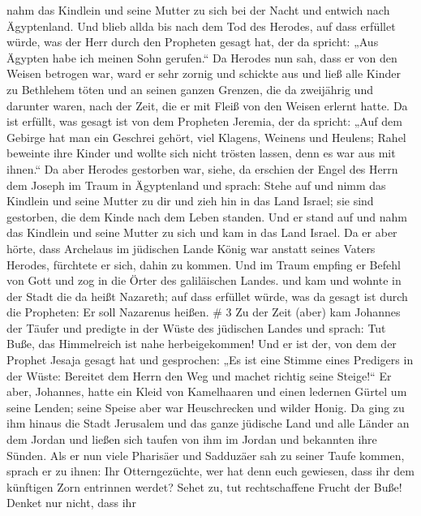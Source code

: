 nahm das Kindlein und seine Mutter zu sich bei der Nacht und entwich
nach Ägyptenland.  Und blieb allda bis nach dem Tod des
Herodes, auf dass erfüllet würde, was der Herr durch den Propheten
gesagt hat, der da spricht: „Aus Ägypten habe ich meinen Sohn gerufen.``
 Da Herodes nun sah, dass er von den Weisen betrogen war,
ward er sehr zornig und schickte aus und ließ alle Kinder zu Bethlehem
töten und an seinen ganzen Grenzen, die da zweijährig und darunter
waren, nach der Zeit, die er mit Fleiß von den Weisen erlernt hatte.
 Da ist erfüllt, was gesagt ist von dem Propheten Jeremia,
der da spricht:  „Auf dem Gebirge hat man ein Geschrei
gehört, viel Klagens, Weinens und Heulens; Rahel beweinte ihre Kinder
und wollte sich nicht trösten lassen, denn es war aus mit ihnen.``
 Da aber Herodes gestorben war, siehe, da erschien der
Engel des Herrn dem Joseph im Traum in Ägyptenland  und
sprach: Stehe auf und nimm das Kindlein und seine Mutter zu dir und zieh
hin in das Land Israel; sie sind gestorben, die dem Kinde nach dem Leben
standen.  Und er stand auf und nahm das Kindlein und seine
Mutter zu sich und kam in das Land Israel.  Da er aber
hörte, dass Archelaus im jüdischen Lande König war anstatt seines Vaters
Herodes, fürchtete er sich, dahin zu kommen. Und im Traum empfing er
Befehl von Gott und zog in die Örter des galiläischen Landes.
 und kam und wohnte in der Stadt die da heißt Nazareth; auf
dass erfüllet würde, was da gesagt ist durch die Propheten: Er soll
Nazarenus heißen. \# 3  Zu der Zeit (aber) kam Johannes der
Täufer und predigte in der Wüste des jüdischen Landes  und
sprach: Tut Buße, das Himmelreich ist nahe herbeigekommen! 
Und er ist der, von dem der Prophet Jesaja gesagt hat und gesprochen:
„Es ist eine Stimme eines Predigers in der Wüste: Bereitet dem Herrn den
Weg und machet richtig seine Steige!{}``  Er aber, Johannes,
hatte ein Kleid von Kamelhaaren und einen ledernen Gürtel um seine
Lenden; seine Speise aber war Heuschrecken und wilder Honig.
 Da ging zu ihm hinaus die Stadt Jerusalem und das ganze
jüdische Land und alle Länder an dem Jordan  und ließen sich
taufen von ihm im Jordan und bekannten ihre Sünden.  Als er
nun viele Pharisäer und Sadduzäer sah zu seiner Taufe kommen, sprach er
zu ihnen: Ihr Otterngezüchte, wer hat denn euch gewiesen, dass ihr dem
künftigen Zorn entrinnen werdet?  Sehet zu, tut
rechtschaffene Frucht der Buße!  Denket nur nicht, dass ihr

